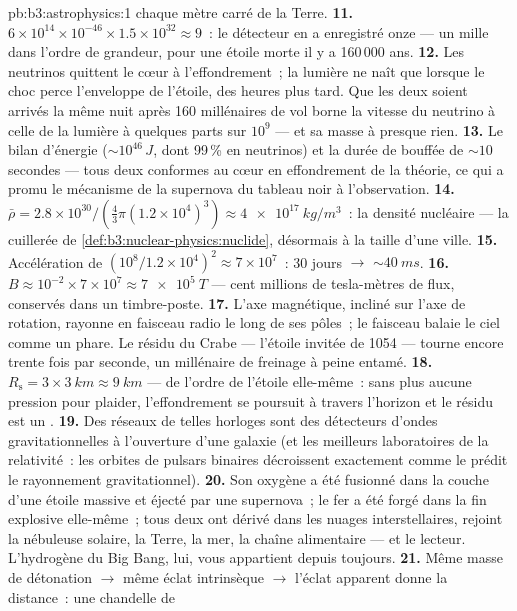 \begin{solution}{pb:b3:astrophysics:1}
chaque mètre carré de la Terre.
\textbf{11.} $6\times10^{14}\times10^{-46}\times1.5\times
10^{32} \approx 9$~: le détecteur en a enregistré onze --- un
mille dans l'ordre de grandeur, pour une étoile morte il y a
160\,000 ans.
\textbf{12.} Les neutrinos quittent le cœur à l'effondrement~; la
lumière ne naît que lorsque le choc perce l'enveloppe de l'étoile,
des heures plus tard. Que les deux soient arrivés la même nuit après
160 millénaires de vol borne la vitesse du neutrino à celle de la
lumière à quelques parts sur $10^{9}$ --- et sa masse à presque
rien.
\textbf{13.} Le bilan d'énergie ($\sim10^{46}\,\unit{J}$, dont
99\,\% en neutrinos) et la durée de bouffée de ${\sim}10$ secondes
--- tous deux conformes au cœur en effondrement de la théorie, ce
qui a promu le mécanisme de la supernova du tableau noir à
l'observation.
\textbf{14.} $\bar\rho = 2.8\times10^{30}/(\tfrac43\pi
(1.2\times10^4)^3) \approx \qty{4e17}{kg/m^3}$~: la densité
nucléaire --- la cuillerée de
\cref{def:b3:nuclear-physics:nuclide}, désormais à la taille d'une
ville.
\textbf{15.} Accélération de $(10^8/1.2\times10^4)^2 \approx
7\times10^{7}$~: 30 jours $\to$ ${\sim}\qty{40}{ms}$.
\textbf{16.} $B \approx 10^{-2}\times7\times10^{7} \approx
\qty{7e5}{T}$ --- cent millions de tesla-mètres de flux, conservés
dans un timbre-poste.
\textbf{17.} L'axe magnétique, incliné sur l'axe de rotation,
rayonne en faisceau radio le long de ses pôles~; le faisceau balaie
le ciel comme un phare. Le résidu du Crabe --- l'étoile invitée de
1054 --- tourne encore trente fois par seconde, un millénaire de
freinage à peine entamé.
\textbf{18.} $R_{\text{s}} = 3\times\qty{3}{km} \approx
\qty{9}{km}$ --- de l'ordre de l'étoile elle-même~: sans plus
aucune pression pour plaider, l'effondrement se poursuit à travers
l'horizon et le résidu est un .
\textbf{19.} Des réseaux de telles horloges sont des détecteurs
d'ondes gravitationnelles à l'ouverture d'une galaxie (et les
meilleurs laboratoires de la relativité~: les orbites de pulsars
binaires décroissent exactement comme le prédit le rayonnement
gravitationnel).
\textbf{20.} Son oxygène a été fusionné dans la couche d'une étoile
massive et éjecté par une supernova~; le fer a été forgé dans la
fin explosive elle-même~; tous deux ont dérivé dans les nuages
interstellaires, rejoint la nébuleuse solaire, la Terre, la mer, la
chaîne alimentaire --- et le lecteur. L'hydrogène du Big Bang, lui,
vous appartient depuis toujours.
\textbf{21.} Même masse de détonation $\to$ même éclat intrinsèque
$\to$ l'éclat apparent donne la distance~: une chandelle de

\end{solution}
